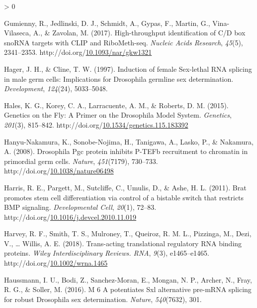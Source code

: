 \documentclass[12pt,oneside]{reedthesis}
\newlength{\cslhangindent}
\newenvironment{CSLReferences}[2] %
 {%
  \setlength{\parindent}{0pt}
  \ifodd #1 \everypar{\setlength{\hangindent}{\cslhangindent}}\ignorespaces\fi
  \ifnum #2 > 0
  \setlength{\parskip}{#2\baselineskip}
  \fi
 }%
 {}
\begin{document}
\begin{CSLReferences}{1}{0}
\leavevmode\hypertarget{ref-Gumienny2017c}{}%
Gumienny, R., Jedlinski, D. J., Schmidt, A., Gypas, F., Martin, G., Vina-Vilaseca, A., \& Zavolan, M. (2017). High-throughput identification of {C}/{D} box {snoRNA} targets with {CLIP} and {RiboMeth}-seq. \emph{Nucleic Acids Research}, \emph{45}(5), 2341--2353. http://doi.org/\href{https://doi.org/10.1093/nar/gkw1321}{10.1093/nar/gkw1321}

\leavevmode\hypertarget{ref-Hager1997}{}%
Hager, J. H., \& Cline, T. W. (1997). Induction of female {Sex}-lethal {RNA} splicing in male germ cells: Implications for {Drosophila} germline sex determination. \emph{Development}, \emph{124}(24), 5033--5048.

\leavevmode\hypertarget{ref-Hales2015a}{}%
Hales, K. G., Korey, C. A., Larracuente, A. M., \& Roberts, D. M. (2015). Genetics on the {Fly}: {A Primer} on the {Drosophila Model System}. \emph{Genetics}, \emph{201}(3), 815--842. http://doi.org/\href{https://doi.org/10.1534/genetics.115.183392}{10.1534/genetics.115.183392}

\leavevmode\hypertarget{ref-Hanyu-Nakamura2008g}{}%
Hanyu-Nakamura, K., Sonobe-Nojima, H., Tanigawa, A., Lasko, P., \& Nakamura, A. (2008). Drosophila {Pgc} protein inhibits {P}-{TEFb} recruitment to chromatin in primordial germ cells. \emph{Nature}, \emph{451}(7179), 730--733. http://doi.org/\href{https://doi.org/10.1038/nature06498}{10.1038/nature06498}

\leavevmode\hypertarget{ref-Harris2011i}{}%
Harris, R. E., Pargett, M., Sutcliffe, C., Umulis, D., \& Ashe, H. L. (2011). Brat promotes stem cell differentiation via control of a bistable switch that restricts {BMP} signaling. \emph{Developmental Cell}, \emph{20}(1), 72--83. http://doi.org/\href{https://doi.org/10.1016/j.devcel.2010.11.019}{10.1016/j.devcel.2010.11.019}

\leavevmode\hypertarget{ref-Harvey2018f}{}%
Harvey, R. F., Smith, T. S., Mulroney, T., Queiroz, R. M. L., Pizzinga, M., Dezi, V., \ldots{} Willis, A. E. (2018). Trans-acting translational regulatory {RNA} binding proteins. \emph{Wiley Interdisciplinary Reviews. RNA}, \emph{9}(3), e1465--e1465. http://doi.org/\href{https://doi.org/10.1002/wrna.1465}{10.1002/wrna.1465}

\leavevmode\hypertarget{ref-Haussmann2016}{}%
Haussmann, I. U., Bodi, Z., Sanchez-Moran, E., Mongan, N. P., Archer, N., Fray, R. G., \& Soller, M. (2016). M 6 {A} potentiates {Sxl} alternative pre-{mRNA} splicing for robust {Drosophila} sex determination. \emph{Nature}, \emph{540}(7632), 301.


\end{CSLReferences}
\end{document}
